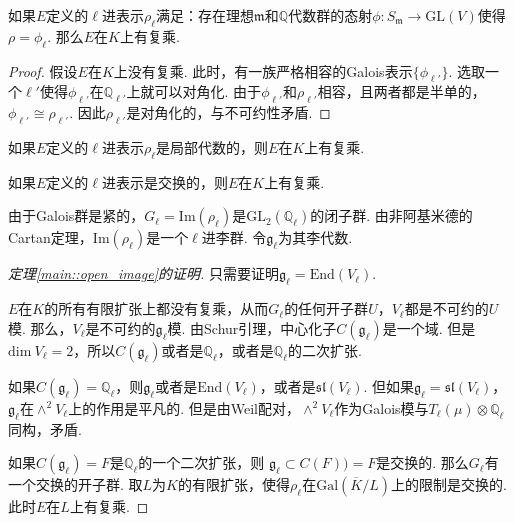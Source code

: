 \begin{cthm}
    如果$E$定义的$\ell$进表示$\rho_{\ell}$满足：存在理想$\mathfrak{m}$和$\mathbb{Q}$代数群的态射$\phi: S_{\mathfrak{m}}\to \mathrm{GL}(V)$使得$\rho = \phi_{\ell}$. 那么$E$在$K$上有复乘.
\end{cthm}

\begin{proof}
    假设$E$在$K$上没有复乘. 此时，有一族严格相容的Galois表示$\{\phi_{\ell'}\}$. 选取一个$\ell'$使得$\phi_{\ell'}$在$\mathbb{Q}_{\ell'}$上就可以对角化. 由于$\phi_{\ell'}$和$\rho_{\ell'}$相容，且两者都是半单的，$\phi_{\ell'}\cong \rho_{\ell'}$. 因此$\rho_{\ell'}$是对角化的，与不可约性矛盾.
\end{proof}

\begin{ccor}
    如果$E$定义的$\ell$进表示$\rho_{\ell}$是局部代数的，则$E$在$K$上有复乘. \label{reps::when_cm}
\end{ccor}

\begin{ccor}
    如果$E$定义的$\ell$进表示是交换的，则$E$在$K$上有复乘.
\end{ccor}

由于Galois群是紧的，$G_{\ell} = \mathrm{Im}(\rho_\ell)$是$\mathrm{GL}_2(\mathbb{Q}_{\ell})$的闭子群. 由非阿基米德的Cartan定理，$\mathrm{Im}(\rho_{\ell})$是一个$\ell$进李群. 令$\mathfrak{g}_{\ell}$为其李代数.

\begin{proof}[定理\ref{main::open_image}的证明]
    只需要证明$\mathfrak{g}_{\ell} = \mathrm{End}(V_{\ell})$.

    $E$在$K$的所有有限扩张上都没有复乘，从而$G_{\ell}$的任何开子群$U$，$V_{\ell}$都是不可约的$U$模. 那么，$V_{\ell}$是不可约的$\mathfrak{g}_{\ell}$模. 由Schur引理，中心化子$C(\mathfrak{g}_{\ell})$是一个域. 但是$\mathrm{dim}\ V_{\ell}=2$，所以$C(\mathfrak{g}_{\ell})$或者是$\mathbb{Q}_{\ell}$，或者是$\mathbb{Q}_{\ell}$的二次扩张.

    如果$C(\mathfrak{g}_{\ell}) = \mathbb{Q}_{\ell}$，则$\mathfrak{g}_{\ell}$或者是$\mathrm{End}(V_{\ell})$，或者是$\mathfrak{sl}(V_{\ell})$. 但如果$\mathfrak{g}_{\ell} = \mathfrak{sl}(V_{\ell})$，$\mathfrak{g}_{\ell}$在$\wedge^2 V_{\ell}$上的作用是平凡的. 但是由Weil配对，$\wedge^2 V_{\ell}$作为Galois模与$T_{\ell}(\mu)\otimes \mathbb{Q}_{\ell}$同构，矛盾.

    如果$C(\mathfrak{g}_{\ell}) = F$是$\mathbb{Q}_{\ell}$的一个二次扩张，则
    $\mathfrak{g}_{\ell}\subset C(F)) = F$是交换的. 那么$G_{\ell}$有一个交换的开子群.
    取$L$为$K$的有限扩张，使得$\rho_{\ell}$在$\mathrm{Gal}(\overline{K}/L)$上的限制是交换的.
    此时$E$在$L$上有复乘.

\end{proof}
